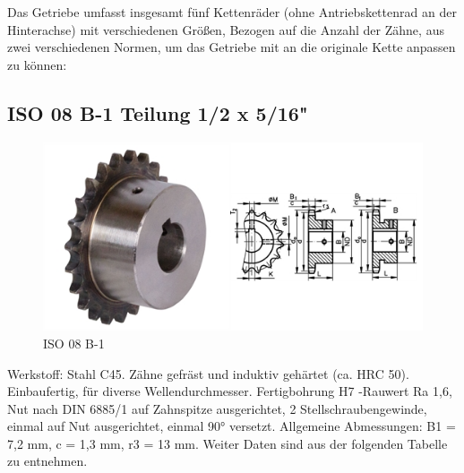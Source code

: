 Das Getriebe umfasst insgesamt fünf Kettenräder (ohne Antriebskettenrad an der Hinterachse) mit verschiedenen Größen, Bezogen auf die Anzahl der Zähne, aus zwei verschiedenen Normen, um das Getriebe mit an die originale Kette anpassen zu können: 

\subsection*{ISO 08 B-1 Teilung 1/2 x 5/16"}

\begin{figure} [H]
	\begin{center}
		\includegraphics[scale=0.7]{figures/mechanik/ISO 08 B-1 .PNG}
			\caption{ISO 08 B-1}
			\label{fig:ISO 08 B-1}
	\end{center}
\end{figure}

Werkstoff: Stahl C45. Zähne gefräst und induktiv gehärtet (ca. HRC 50). Einbaufertig, für diverse Wellendurchmesser. Fertigbohrung H7 -Rauwert Ra 1,6, Nut nach DIN 6885/1 auf Zahnspitze ausgerichtet, 2 Stellschraubengewinde, einmal auf Nut ausgerichtet, einmal 90° versetzt. Allgemeine Abmessungen: B1 = 7,2 mm, c = 1,3 mm, r3 = 13 mm. 
Weiter Daten sind aus der folgenden Tabelle zu entnehmen.


